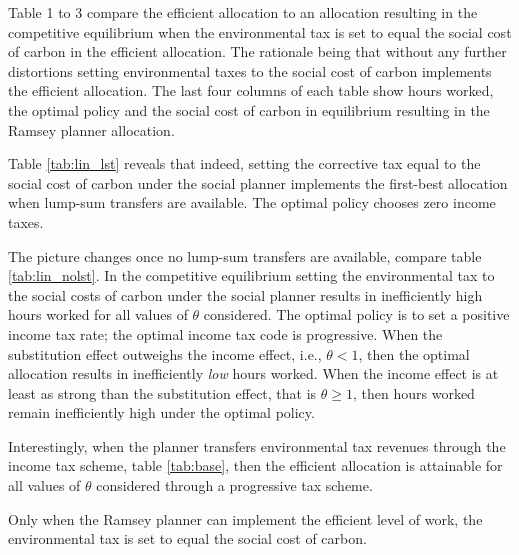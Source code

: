 Table 1 to 3 compare the efficient allocation to an allocation resulting in the competitive equilibrium when the environmental tax is set to equal the social cost of carbon in the efficient allocation. The rationale being that without any further distortions setting environmental taxes to the social cost of carbon implements the efficient allocation. The last four columns of each table show hours worked, the optimal policy and the social cost of carbon in equilibrium resulting in the Ramsey planner allocation. 

Table \ref{tab:lin_lst} reveals that indeed, setting the corrective tax equal to the social cost of carbon under the social planner implements the first-best allocation when lump-sum transfers are available. The optimal policy chooses zero income taxes. 

The picture changes once no lump-sum transfers are available, compare table \ref{tab:lin_nolst}. In the competitive equilibrium setting the environmental tax to the social costs of carbon under the social planner results in inefficiently high hours worked for all values of $\theta$ considered. The optimal policy is to set a positive income tax rate; the optimal income tax code is progressive. When the substitution effect outweighs the income effect, i.e., $\theta<1$, then the optimal allocation results in inefficiently \textit{low} hours worked. When the income effect is at least as strong than the substitution effect, that is $\theta\geq 1$, then hours worked remain inefficiently high under the optimal policy. 

Interestingly, when the planner transfers environmental tax revenues through the income tax scheme, table \ref{tab:base}, then the efficient allocation is attainable for all values of $\theta$ considered through a progressive tax scheme. 

Only when the Ramsey planner can implement the efficient level of work, the environmental tax is set to equal the social cost of carbon.   


